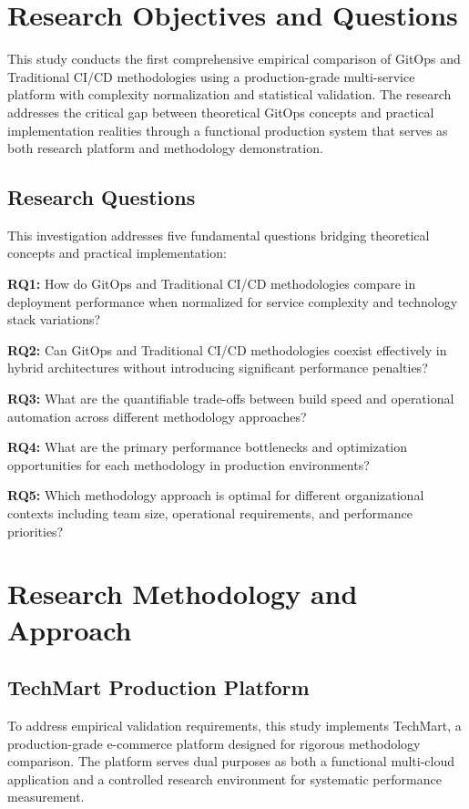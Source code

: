 \section{Research Objectives and Questions}

This study conducts the first comprehensive empirical comparison of GitOps and Traditional CI/CD methodologies using a production-grade multi-service platform with complexity normalization and statistical validation. The research addresses the critical gap between theoretical GitOps concepts and practical implementation realities through a functional production system that serves as both research platform and methodology demonstration.

\subsection{Research Questions}
This investigation addresses five fundamental questions bridging theoretical concepts and practical implementation:

\textbf{RQ1:} How do GitOps and Traditional CI/CD methodologies compare in deployment performance when normalized for service complexity and technology stack variations?

\textbf{RQ2:} Can GitOps and Traditional CI/CD methodologies coexist effectively in hybrid architectures without introducing significant performance penalties?

\textbf{RQ3:} What are the quantifiable trade-offs between build speed and operational automation across different methodology approaches?

\textbf{RQ4:} What are the primary performance bottlenecks and optimization opportunities for each methodology in production environments?

\textbf{RQ5:} Which methodology approach is optimal for different organizational contexts including team size, operational requirements, and performance priorities?

\section{Research Methodology and Approach}

\subsection{TechMart Production Platform}
To address empirical validation requirements, this study implements TechMart, a production-grade e-commerce platform designed for rigorous methodology comparison. The platform serves dual purposes as both a functional multi-cloud application and a controlled research environment for systematic performance measurement.

